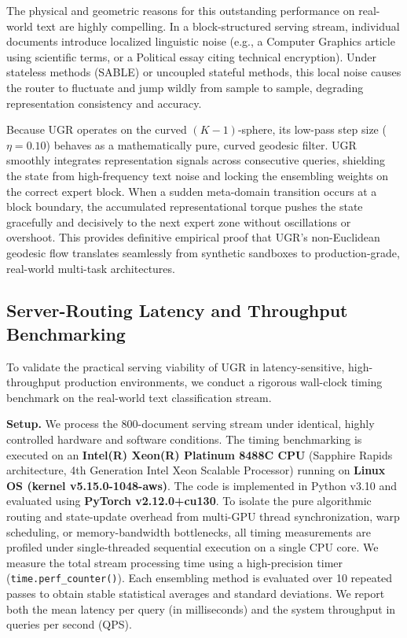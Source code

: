 The physical and geometric reasons for this outstanding performance on real-world text are highly compelling. In a block-structured serving stream, individual documents introduce localized linguistic noise (e.g., a Computer Graphics article using scientific terms, or a Political essay citing technical encryption). Under stateless methods (SABLE) or uncoupled stateful methods, this local noise causes the router to fluctuate and jump wildly from sample to sample, degrading representation consistency and accuracy. 

Because UGR operates on the curved $(K-1)$-sphere, its low-pass step size ($\eta=0.10$) behaves as a mathematically pure, curved geodesic filter. UGR smoothly integrates representation signals across consecutive queries, shielding the state from high-frequency text noise and locking the ensembling weights on the correct expert block. When a sudden meta-domain transition occurs at a block boundary, the accumulated representational torque pushes the state gracefully and decisively to the next expert zone without oscillations or overshoot. This provides definitive empirical proof that UGR's non-Euclidean geodesic flow translates seamlessly from synthetic sandboxes to production-grade, real-world multi-task architectures.

\subsection{Server-Routing Latency and Throughput Benchmarking}
\label{subsec:latency_benchmarking}
To validate the practical serving viability of UGR in latency-sensitive, high-throughput production environments, we conduct a rigorous wall-clock timing benchmark on the real-world text classification stream.

\textbf{Setup.} We process the 800-document serving stream under identical, highly controlled hardware and software conditions. The timing benchmarking is executed on an \textbf{Intel(R) Xeon(R) Platinum 8488C CPU} (Sapphire Rapids architecture, 4th Generation Intel Xeon Scalable Processor) running on \textbf{Linux OS (kernel v5.15.0-1048-aws)}. The code is implemented in Python v3.10 and evaluated using \textbf{PyTorch v2.12.0+cu130}. To isolate the pure algorithmic routing and state-update overhead from multi-GPU thread synchronization, warp scheduling, or memory-bandwidth bottlenecks, all timing measurements are profiled under single-threaded sequential execution on a single CPU core. We measure the total stream processing time using a high-precision timer (\texttt{time.perf\_counter()}). Each ensembling method is evaluated over 10 repeated passes to obtain stable statistical averages and standard deviations. We report both the mean latency per query (in milliseconds) and the system throughput in queries per second (QPS).

